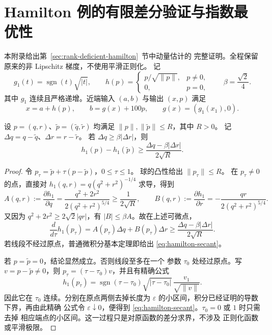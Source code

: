 \section{Hamilton 例的有限差分验证与指数最优性}
\label{app:hamilton-finite-difference}

本附录给出第~\ref{sec:rank-deficient-hamilton}~节中动量估计的
完整证明。全程保留原来的非 Lipschitz 梯度，不使用平滑正则化。
记
\[
 g_1(t)=\operatorname{sgn}(t)\sqrt{|t|},\qquad
 h(p)=\begin{cases}p/\sqrt{\|p\|},&p\ne0,\\0,&p=0,\end{cases}
 \qquad \beta=\frac{\sqrt2}{4}.
\]
其中 $g_1$ 连续且严格递增。近端输入 $(a,b)$ 与输出 $(x,p)$
满足
\begin{equation}
\label{eq:hamilton-app-prox}
 x=a+h(p),\qquad b=g(x)+100p,
 \qquad g(x)=(g_1(x_1),0).
\end{equation}

\begin{lemma}[动量球上的有限差分]
\label{lem:hamilton-secant}
设 $p=(q,r)$、$\widetilde p=(\widetilde q,\widetilde r)$
均满足 $\|p\|,\|\widetilde p\|\leq R$，其中 $R>0$。
记 $\Delta q=q-\widetilde q$、$\Delta r=r-\widetilde r$。
若 $\Delta q\geq\beta|\Delta r|$，则
\begin{equation}
\label{eq:hamilton-secant}
 h_1(p)-h_1(\widetilde p)
 \geq\frac{\Delta q-\beta|\Delta r|}{2\sqrt R}.
\end{equation}
\end{lemma}

\begin{proof}
令 $p_\tau=\widetilde p+\tau(p-\widetilde p)$，$0\leq\tau\leq1$。
球的凸性给出 $\|p_\tau\|\leq R$。
在 $p_\tau\ne0$ 的点，直接对
$h_1(q,r)=q(q^2+r^2)^{-1/4}$ 求导，得到
\[
 A(q,r):=\frac{\partial h_1}{\partial q}
 =\frac{q^2+2r^2}{2(q^2+r^2)^{5/4}}
 \geq\frac1{2\sqrt R},\qquad
 B(q,r):=\frac{\partial h_1}{\partial r}
 =-\frac{qr}{2(q^2+r^2)^{5/4}}.
\]
又因为 $q^2+2r^2\geq2\sqrt2|qr|$，有
$|B|\leq\beta A$。故在上述可微点，
\[
 \frac{d}{d\tau}h_1(p_\tau)
 =A(p_\tau)\Delta q+B(p_\tau)\Delta r
 \geq\frac{\Delta q-\beta|\Delta r|}{2\sqrt R}.
\]
若线段不经过原点，普通微积分基本定理即给出
\eqref{eq:hamilton-secant}。

若 $p=\widetilde p=0$，结论显然成立。否则线段至多在一个
参数 $\tau_0$ 处经过原点。写 $v=p-\widetilde p\ne0$，则
$p_\tau=(\tau-\tau_0)v$，并且有精确公式
\[
 h_1(p_\tau)
 =\operatorname{sgn}(\tau-\tau_0)
   \sqrt{|\tau-\tau_0|}\,\frac{v_1}{\sqrt{\|v\|}}.
\]
因此它在 $\tau_0$ 连续。分别在原点两侧去掉长度为
$\varepsilon$ 的小区间，积分已经证明的导数下界，再由此精确
公式令 $\varepsilon\downarrow0$，便得到
\eqref{eq:hamilton-secant}。$\tau_0=0$ 或 $1$ 时只需去掉
相应端点的小区间。这一过程只是对原函数的差分求界，不涉及
正则化函数或平滑极限。
\end{proof}

